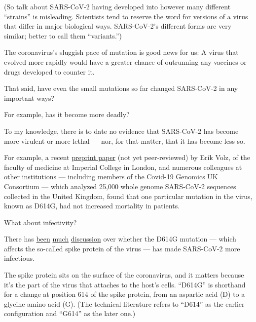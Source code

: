 (So talk about SARS-CoV-2 having developed into however many different
``strains'' is
\href{https://www.virology.ws/2020/05/07/there-is-one-and-only-one-strain-of-sars-cov-2/}{misleading}.
Scientists tend to reserve the word for versions of a virus that differ
in major biological ways. SARS-CoV-2's different forms are very similar;
better to call them ``variants.'')

The coronavirus's sluggish pace of mutation is good news for us: A virus
that evolved more rapidly would have a greater chance of outrunning any
vaccines or drugs developed to counter it.

That said, have even the small mutations so far changed SARS-CoV-2 in
any important ways?

For example, has it become more deadly?

To my knowledge, there is to date no evidence that SARS-CoV-2 has become
more virulent or more lethal --- nor, for that matter, that it has
become less so.

For example, a recent
\href{https://www.medrxiv.org/content/10.1101/2020.07.31.20166082v2}{preprint
paper} (not yet peer-reviewed) by Erik Volz, of the faculty of medicine
at Imperial College in London, and numerous colleagues at other
institutions --- including members of the Covid-19 Genomics UK
Consortium --- which analyzed 25,000 whole genome SARS-CoV-2 sequences
collected in the United Kingdom, found that one particular mutation in
the virus, known as D614G, had not increased mortality in patients.

What about infectivity?

There has
\href{https://www.nytimes3xbfgragh.onion/2020/06/12/science/coronavirus-mutation-genetics-spike.html}{been}
\href{https://medium.com/microbial-instincts/what-the-d614g-mutation-means-for-covid-19-spread-fatality-treatment-and-vaccine-7dda1c066f0d}{much}
\href{https://www.businessinsider.com.au/new-coronavirus-strain-infectious-does-not-make-people-sicker-study-2020-7?r=US\&IR=T}{discussion}
over whether the D614G mutation --- which affects the so-called spike
protein of the virus --- has made SARS-CoV-2 more infectious.

The spike protein sits on the surface of the coronavirus, and it matters
because it's the part of the virus that attaches to the host's cells.
``D614G'' is shorthand for a change at position 614 of the spike
protein, from an aspartic acid (D) to a glycine amino acid (G). (The
technical literature refers to ``D614'' as the earlier configuration and
``G614'' as the later one.)


